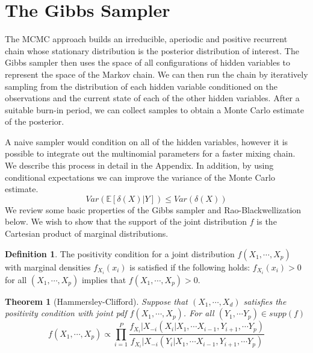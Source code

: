 \documentclass{article}%
\newtheorem{theorem}{Theorem}[section]
\theoremstyle{definition}
\newtheorem{definition}{Definition}[section]
\begin{document}
\section{The Gibbs Sampler}
\label{sec:gibbs}
The MCMC approach builds an irreducible, aperiodic and positive recurrent chain whose stationary distribution is the posterior distribution of interest. The Gibbs sampler then uses the space of all configurations of hidden variables to represent the space of the Markov chain. We can then run the chain by iteratively sampling from the distribution of each hidden variable conditioned on the observations and the current state of each of the other hidden variables. After a suitable burn-in period, we can collect samples to obtain a Monte Carlo estimate of the posterior. 

A naive sampler would condition on all of the hidden variables, however it is possible to integrate out the multinomial parameters for a faster mixing chain. We describe this process in detail in the Appendix. In addition, by using conditional expectations we can improve the variance of the Monte Carlo estimate. 
\begin{equation}
    Var(\mathbb{E}[\delta(X)|Y]) \leq Var(\delta(X))
\end{equation}
We review some basic properties of the Gibbs sampler and Rao-Blackwellization below. We wish to show that the support of the joint distribution $f$ is the Cartesian product of marginal distributions. \nocite{Robert:2005:MCS:1051451}
\begin{definition}
The positivity condition for a joint distribution $f(X_1,\cdots, X_p)$ with marginal densities $f_{X_i}(x_i)$ is satisfied if the following holds: $f_{X_i}(x_i) > 0$ for all $(X_1,\cdots, X_p)$ implies that $f(X_1,\cdots, X_p) > 0$.
\end{definition}
\begin{theorem}[Hammersley-Clifford]
\label{thm:hc}
Suppose that $(X_1,\cdots,X_d)$ satisfies the positivity condition with joint pdf $f(X_1,\cdots, X_p)$. For all $(Y_1, \cdots Y_p) \in supp(f)$
\begin{equation}
f(X_1,\cdots, X_p) \propto \prod\limits_{i=1}^{P} \frac{f_{X_i} | X_{-i}(X_i | X_1, \cdots X_{i-1}, Y_{i+1}, \cdots Y_p)}{f_{X_i} | X_{-i}(Y_i | X_1, \cdots X_{i-1}, Y_{i+1}, \cdots Y_p)}
\end{equation}
\end{theorem}
\end{document}
